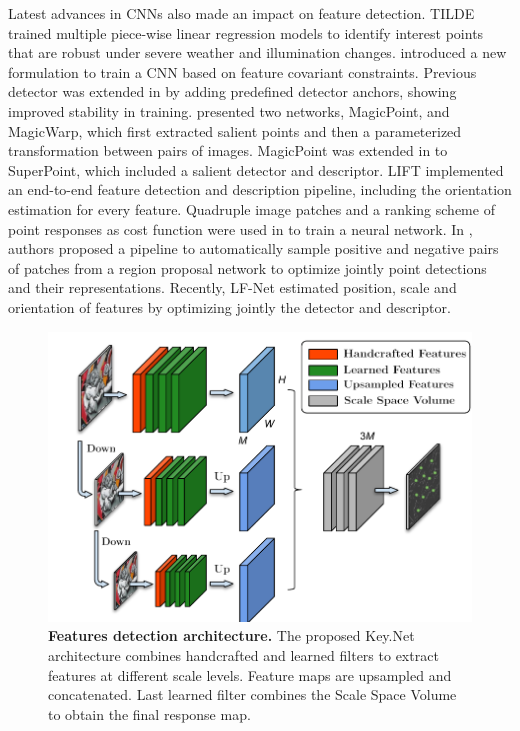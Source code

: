 Latest advances in CNNs also made an impact on feature detection. TILDE \cite{TILDE} trained multiple piece-wise linear regression models to identify interest points that are robust under severe weather and illumination changes. \cite{Karel_Vedaldi_ECCV_16} introduced a new formulation to train a CNN based on feature covariant constraints. 
Previous detector was extended in \cite{Zhang_Felix_CVPR_17} by adding predefined detector anchors, showing improved stability in training. \cite{DeTone_MagicPoint17} presented two networks, MagicPoint, and MagicWarp, which first extracted salient points and then a parameterized transformation between pairs of images. MagicPoint was extended in \cite{detone2017superpoint} to SuperPoint, which included a salient detector and descriptor.
LIFT \cite{LIFT} implemented an end-to-end feature detection and description pipeline, including the orientation estimation for every feature. Quadruple image patches and a ranking scheme of point responses as cost function were used in \cite{savinov2016quad} to train a neural network. In \cite{Georgakis_Karanam_CVPR18}, authors proposed a pipeline to automatically sample positive and negative pairs of patches from a region proposal network to optimize jointly point detections and their representations. Recently, LF-Net \cite{OnoSerra18} estimated position, scale and orientation of features by optimizing jointly the detector and descriptor.

\begin{figure}[!tbh]
 \centering
 \hspace*{-1cm}    
   \includegraphics[scale=0.7]{main/chapter02/figures/keynet_inference.pdf}
   \vspace{-0.20cm}
    \caption[Features detection architecture]{\textbf{Features detection architecture.} The proposed Key.Net architecture combines handcrafted and learned filters to extract features at different scale levels. Feature maps are upsampled and concatenated. Last learned filter combines the Scale Space Volume to obtain the final response map.}
    \label{keynet_fig:net_architecture}
\end{figure}

